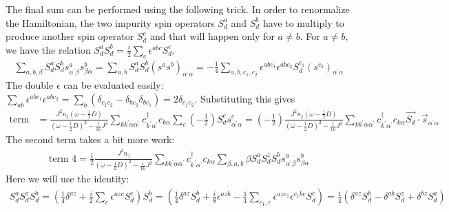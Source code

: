 \documentclass{revtex4-2}
\numberwithin{equation}{section}
\begin{document}
The final sum can be performed using the following trick. In order to renormalize the Hamiltonian, the two impurity spin operators \(S_d^a\) and \(S_d^b\) have to multiply to produce another spin operator \(S_d^c\) and that will happen only for \(a\neq b\). For \(a \neq b\), we have the relation \(S_d^a S_d^b = \frac{i}{2}\sum_c \epsilon^{abc}S_d^c\).
\begin{equation}\begin{aligned}
	\sum_{a,b,\beta}S_d^a S_d^b s^a_{\alpha^\prime \beta}s^b_{\beta \alpha} = \sum_{a,b}S_d^a S_d^b \left(s^a s^b\right)_{\alpha^\prime \alpha} = -\frac{1}{4}\sum_{a,b,c_1,c_2}\epsilon^{abc_1}\epsilon^{abc_2}S_d^{c_1}\left(s^{c_2}\right)_{\alpha^\prime \alpha} 
\end{aligned}\end{equation}
The double \(\epsilon\) can be evaluated easily: \(\sum_{ab}\epsilon^{abc_1}\epsilon^{abc_2} = \sum_b\left(\delta_{c_1 c_2} - \delta_{b c_2}\delta_{b c_1}\right) = 2 \delta_{c_1 c_2}\). Substituting this gives
\begin{equation}\begin{aligned}
	\label{term1}
	\text{term 3} &= \frac{J^2 n_j \left(\omega - \frac{1}{2}D\right)}{\left(\omega - \frac{1}{2}D\right)^2 - \frac{1}{16}J^2}\sum_{k k^\prime \alpha \alpha^\prime} c^\dagger_{k^\prime\alpha^\prime} c_{k\alpha} \sum_{c} \left(-\frac{1}{2}\right)S_d^c s^c_{\alpha^\prime \alpha} = \left(-\frac{1}{2}\right)\frac{J^2 n_j \left(\omega - \frac{1}{2}D\right)}{\left(\omega - \frac{1}{2}D\right)^2 - \frac{1}{16}J^2}\sum_{k k^\prime \alpha \alpha^\prime} c^\dagger_{k^\prime\alpha^\prime} c_{k\alpha}  \vec{S_d}\cdot\vec{s}_{\alpha^\prime \alpha}
\end{aligned}\end{equation}
The second term takes a bit more work:
\begin{equation}\begin{aligned}
	\text{term 4} = \frac{1}{2}\frac{J^3 n_j }{\left(\omega - \frac{1}{2}D\right)^2 - \frac{1}{16}J^2}\sum_{k k^\prime \alpha \alpha^\prime} c^\dagger_{k^\prime\alpha^\prime} c_{k\alpha} \sum_{\beta,a,b}\beta S_d^a S_d^z  S_d^bs^a_{\alpha^\prime \beta}s^b_{\beta \alpha}
\end{aligned}\end{equation}
Here we will use the identity:
\begin{equation}\begin{aligned}
	\label{identity_SSS}
	S_d^a S_d^z S_d^b = \left(\frac{1}{4}\delta^{az} + \frac{i}{2}\sum_c \epsilon^{azc}S_d^c\right)S_d^b = \left(\frac{1}{4}\delta^{az}S_d^b + \frac{i}{8} \epsilon^{azb}  - \frac{1}{4}\sum_{c_1,c} \epsilon^{azc_1} \epsilon^{c_1 b c} S_d^c\right) = \frac{1}{4}\left(\delta^{az}S_d^b - \delta^{ab}S_d^z + \delta^{bz}S_d^a\right)
\end{aligned}\end{equation}
\end{document}
